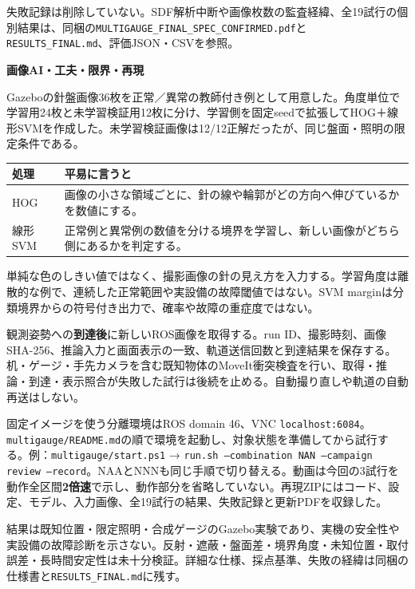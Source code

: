 \documentclass[a4paper,11pt]{article}
\newcommand{\heading}[1]{\par\vspace{5pt}{\large\bfseries #1}\par\vspace{1pt}}
\begin{document}
失敗記録は削除していない。SDF解析中断や画像枚数の監査経緯、全19試行の個別結果は、同梱の\texttt{MULTIGAUGE\_FINAL\_SPEC\_CONFIRMED.pdf}と\texttt{RESULTS\_FINAL.md}、評価JSON・CSVを参照。

\newpage
{\LARGE\bfseries 画像AI・工夫・限界・再現}\par

\heading{1．AIは何をしているか}
Gazeboの針盤画像36枚を正常／異常の教師付き例として用意した。角度単位で学習用24枚と未学習検証用12枚に分け、学習側を固定seedで拡張してHOG＋線形SVMを作成した。未学習検証画像は12/12正解だったが、同じ盤面・照明の限定条件である。

\begin{tabularx}{\linewidth}{@{}p{28mm}X@{}}
\toprule
処理 & 平易に言うと \\
\midrule
HOG & 画像の小さな領域ごとに、針の線や輪郭がどの方向へ伸びているかを数値にする。\\
線形SVM & 正常例と異常例の数値を分ける境界を学習し、新しい画像がどちら側にあるかを判定する。\\
\bottomrule
\end{tabularx}

単純な色のしきい値ではなく、撮影画像の針の見え方を入力する。学習角度は離散的な例で、連続した正常範囲や実設備の故障閾値ではない。SVM marginは分類境界からの符号付き出力で、確率や故障の重症度ではない。

\heading{2．実行と記録の工夫}
観測姿勢への\textbf{到達後}に新しいROS画像を取得する。run ID、撮影時刻、画像SHA-256、推論入力と画面表示の一致、軌道送信回数と到達結果を保存する。机・ゲージ・手先カメラを含む既知物体のMoveIt衝突検査を行い、取得・推論・到達・表示照合が失敗した試行は後続を止める。自動撮り直しや軌道の自動再送はしない。

\heading{3．再現方法と確認先}
固定イメージを使う分離環境はROS domain 46、VNC \texttt{localhost:6084}。\texttt{multigauge/README.md}の順で環境を起動し、対象状態を準備してから試行する。例：\texttt{multigauge/start.ps1} → \texttt{run.sh --combination NAN --campaign review --record}。NAAとNNNも同じ手順で切り替える。動画は今回の3試行を動作全区間\textbf{2倍速}で示し、動作部分を省略していない。再現ZIPにはコード、設定、モデル、入力画像、全19試行の結果、失敗記録と更新PDFを収録した。

\heading{4．限界}
結果は既知位置・限定照明・合成ゲージのGazebo実験であり、実機の安全性や実設備の故障診断を示さない。反射・遮蔽・盤面差・境界角度・未知位置・取付誤差・長時間安定性は未十分検証。詳細な仕様、採点基準、失敗の経緯は同梱の仕様書と\texttt{RESULTS\_FINAL.md}に残す。
\end{document}
